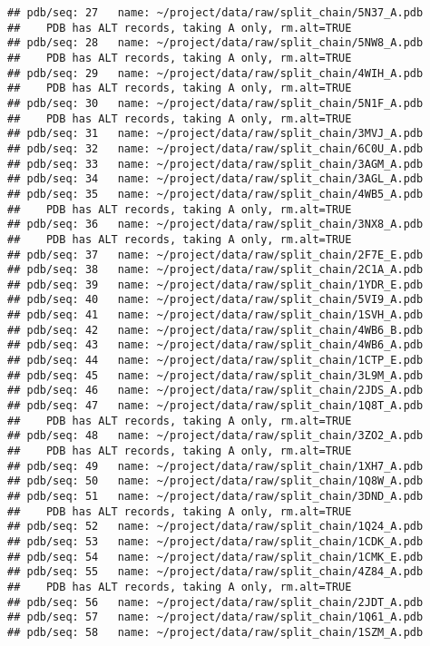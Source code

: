 \documentclass[
]{article}
\begin{document}
\begin{verbatim}
## pdb/seq: 27   name: ~/project/data/raw/split_chain/5N37_A.pdb 
##    PDB has ALT records, taking A only, rm.alt=TRUE
## pdb/seq: 28   name: ~/project/data/raw/split_chain/5NW8_A.pdb 
##    PDB has ALT records, taking A only, rm.alt=TRUE
## pdb/seq: 29   name: ~/project/data/raw/split_chain/4WIH_A.pdb 
##    PDB has ALT records, taking A only, rm.alt=TRUE
## pdb/seq: 30   name: ~/project/data/raw/split_chain/5N1F_A.pdb 
##    PDB has ALT records, taking A only, rm.alt=TRUE
## pdb/seq: 31   name: ~/project/data/raw/split_chain/3MVJ_A.pdb 
## pdb/seq: 32   name: ~/project/data/raw/split_chain/6C0U_A.pdb 
## pdb/seq: 33   name: ~/project/data/raw/split_chain/3AGM_A.pdb 
## pdb/seq: 34   name: ~/project/data/raw/split_chain/3AGL_A.pdb 
## pdb/seq: 35   name: ~/project/data/raw/split_chain/4WB5_A.pdb 
##    PDB has ALT records, taking A only, rm.alt=TRUE
## pdb/seq: 36   name: ~/project/data/raw/split_chain/3NX8_A.pdb 
##    PDB has ALT records, taking A only, rm.alt=TRUE
## pdb/seq: 37   name: ~/project/data/raw/split_chain/2F7E_E.pdb 
## pdb/seq: 38   name: ~/project/data/raw/split_chain/2C1A_A.pdb 
## pdb/seq: 39   name: ~/project/data/raw/split_chain/1YDR_E.pdb 
## pdb/seq: 40   name: ~/project/data/raw/split_chain/5VI9_A.pdb 
## pdb/seq: 41   name: ~/project/data/raw/split_chain/1SVH_A.pdb 
## pdb/seq: 42   name: ~/project/data/raw/split_chain/4WB6_B.pdb 
## pdb/seq: 43   name: ~/project/data/raw/split_chain/4WB6_A.pdb 
## pdb/seq: 44   name: ~/project/data/raw/split_chain/1CTP_E.pdb 
## pdb/seq: 45   name: ~/project/data/raw/split_chain/3L9M_A.pdb 
## pdb/seq: 46   name: ~/project/data/raw/split_chain/2JDS_A.pdb 
## pdb/seq: 47   name: ~/project/data/raw/split_chain/1Q8T_A.pdb 
##    PDB has ALT records, taking A only, rm.alt=TRUE
## pdb/seq: 48   name: ~/project/data/raw/split_chain/3ZO2_A.pdb 
##    PDB has ALT records, taking A only, rm.alt=TRUE
## pdb/seq: 49   name: ~/project/data/raw/split_chain/1XH7_A.pdb 
## pdb/seq: 50   name: ~/project/data/raw/split_chain/1Q8W_A.pdb 
## pdb/seq: 51   name: ~/project/data/raw/split_chain/3DND_A.pdb 
##    PDB has ALT records, taking A only, rm.alt=TRUE
## pdb/seq: 52   name: ~/project/data/raw/split_chain/1Q24_A.pdb 
## pdb/seq: 53   name: ~/project/data/raw/split_chain/1CDK_A.pdb 
## pdb/seq: 54   name: ~/project/data/raw/split_chain/1CMK_E.pdb 
## pdb/seq: 55   name: ~/project/data/raw/split_chain/4Z84_A.pdb 
##    PDB has ALT records, taking A only, rm.alt=TRUE
## pdb/seq: 56   name: ~/project/data/raw/split_chain/2JDT_A.pdb 
## pdb/seq: 57   name: ~/project/data/raw/split_chain/1Q61_A.pdb 
## pdb/seq: 58   name: ~/project/data/raw/split_chain/1SZM_A.pdb 

\end{verbatim}
\end{document}
